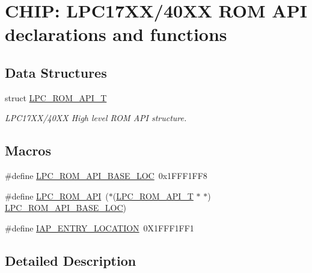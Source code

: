 \hypertarget{group__ROMAPI__407X__8X}{\section{C\-H\-I\-P\-: L\-P\-C17\-X\-X/40\-X\-X R\-O\-M A\-P\-I declarations and functions}
\label{group__ROMAPI__407X__8X}
}
\subsection*{Data Structures}
\begin{DoxyCompactItemize}
\item 
struct \hyperlink{structLPC__ROM__API__T}{L\-P\-C\-\_\-\-R\-O\-M\-\_\-\-A\-P\-I\-\_\-\-T}
\begin{DoxyCompactList}\small\item\em L\-P\-C17\-X\-X/40\-X\-X High level R\-O\-M A\-P\-I structure. \end{DoxyCompactList}\end{DoxyCompactItemize}
\subsection*{Macros}
\begin{DoxyCompactItemize}
\item 
\#define \hyperlink{group__ROMAPI__407X__8X_gafd3ca6cb0ad8c0c0b5be437a8387e51b}{L\-P\-C\-\_\-\-R\-O\-M\-\_\-\-A\-P\-I\-\_\-\-B\-A\-S\-E\-\_\-\-L\-O\-C}~0x1\-F\-F\-F1\-F\-F8
\item 
\#define \hyperlink{group__ROMAPI__407X__8X_ga93f07fc38c09c20a7141e175ce599ef7}{L\-P\-C\-\_\-\-R\-O\-M\-\_\-\-A\-P\-I}~($\ast$(\hyperlink{structLPC__ROM__API__T}{L\-P\-C\-\_\-\-R\-O\-M\-\_\-\-A\-P\-I\-\_\-\-T} $\ast$ $\ast$) \hyperlink{group__ROMAPI__407X__8X_gafd3ca6cb0ad8c0c0b5be437a8387e51b}{L\-P\-C\-\_\-\-R\-O\-M\-\_\-\-A\-P\-I\-\_\-\-B\-A\-S\-E\-\_\-\-L\-O\-C})
\item 
\#define \hyperlink{group__ROMAPI__407X__8X_ga3d74da11ceb6b4ccf6d3730825406515}{I\-A\-P\-\_\-\-E\-N\-T\-R\-Y\-\_\-\-L\-O\-C\-A\-T\-I\-O\-N}~0\-X1\-F\-F\-F1\-F\-F1
\end{DoxyCompactItemize}


\subsection{Detailed Description}


